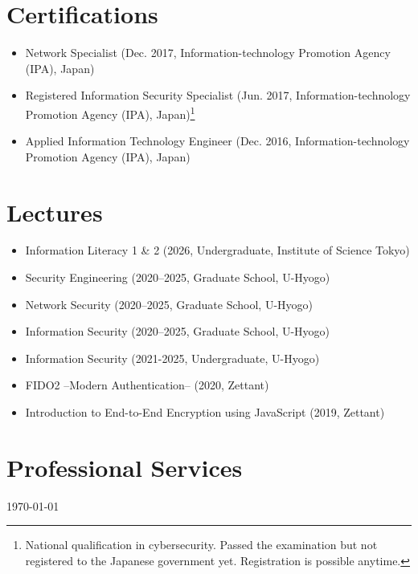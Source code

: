 \section*{Certifications}
\begin{itemize}
  \item Network Specialist (Dec. 2017, Information-technology Promotion Agency (IPA), Japan)
  \item Registered Information Security Specialist (Jun. 2017, Information-technology Promotion Agency (IPA), Japan)\footnote{National qualification in cybersecurity. Passed the examination but not registered to the Japanese government yet. Registration is possible anytime.}
  \item Applied Information Technology Engineer (Dec. 2016, Information-technology Promotion Agency (IPA), Japan)
\end{itemize}

\section*{Lectures}
\begin{itemize}
  \item Information Literacy 1 \& 2 (2026, Undergraduate, Institute of Science Tokyo)
  \item Security Engineering (2020--2025, Graduate School, U-Hyogo)
  \item Network Security (2020--2025, Graduate School, U-Hyogo)
  \item Information Security (2020--2025, Graduate School, U-Hyogo)
  \item Information Security (2021-2025, Undergraduate, U-Hyogo)
  \item FIDO2 –Modern Authentication– (2020, Zettant)
  \item Introduction to End-to-End Encryption using JavaScript (2019, Zettant)
\end{itemize}

\section*{Professional Services}


\bigskip

\begin{center}
  \begin{footnotesize}
    \today \\
    \href{\footerlink}{\texttt{\footerlink}}
  \end{footnotesize}
\end{center}
